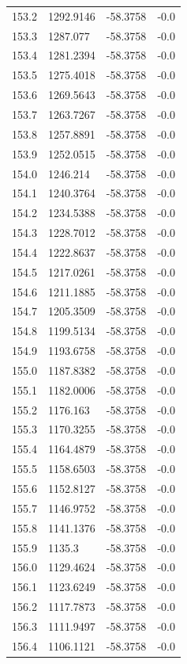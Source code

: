 \begin{table}[H]
\begin{tabular}{llll}
153.2 & 1292.9146 & -58.3758 & -0.0 \\
153.3 & 1287.077 & -58.3758 & -0.0 \\
153.4 & 1281.2394 & -58.3758 & -0.0 \\
153.5 & 1275.4018 & -58.3758 & -0.0 \\
153.6 & 1269.5643 & -58.3758 & -0.0 \\
153.7 & 1263.7267 & -58.3758 & -0.0 \\
153.8 & 1257.8891 & -58.3758 & -0.0 \\
153.9 & 1252.0515 & -58.3758 & -0.0 \\
154.0 & 1246.214 & -58.3758 & -0.0 \\
154.1 & 1240.3764 & -58.3758 & -0.0 \\
154.2 & 1234.5388 & -58.3758 & -0.0 \\
154.3 & 1228.7012 & -58.3758 & -0.0 \\
154.4 & 1222.8637 & -58.3758 & -0.0 \\
154.5 & 1217.0261 & -58.3758 & -0.0 \\
154.6 & 1211.1885 & -58.3758 & -0.0 \\
154.7 & 1205.3509 & -58.3758 & -0.0 \\
154.8 & 1199.5134 & -58.3758 & -0.0 \\
154.9 & 1193.6758 & -58.3758 & -0.0 \\
155.0 & 1187.8382 & -58.3758 & -0.0 \\
155.1 & 1182.0006 & -58.3758 & -0.0 \\
155.2 & 1176.163 & -58.3758 & -0.0 \\
155.3 & 1170.3255 & -58.3758 & -0.0 \\
155.4 & 1164.4879 & -58.3758 & -0.0 \\
155.5 & 1158.6503 & -58.3758 & -0.0 \\
155.6 & 1152.8127 & -58.3758 & -0.0 \\
155.7 & 1146.9752 & -58.3758 & -0.0 \\
155.8 & 1141.1376 & -58.3758 & -0.0 \\
155.9 & 1135.3 & -58.3758 & -0.0 \\
156.0 & 1129.4624 & -58.3758 & -0.0 \\
156.1 & 1123.6249 & -58.3758 & -0.0 \\
156.2 & 1117.7873 & -58.3758 & -0.0 \\
156.3 & 1111.9497 & -58.3758 & -0.0 \\
156.4 & 1106.1121 & -58.3758 & -0.0 \\

\end{tabular}
\end{table}
